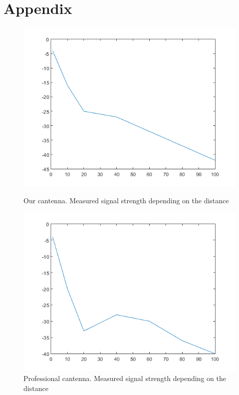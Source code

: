 \documentclass[12pt,a4paper]{article}
\newcommand{\figurewidth}[0]{.65\textwidth}
\begin{document}
\section{Appendix}
\pagestyle{empty}
\begin{figure}\begin{center}
	\includegraphics[width=\figurewidth]{plots/can_p.png}
	\caption{Our cantenna. Measured signal strength depending on the distance}
	\label{img:dist:pow:can}

	\includegraphics[width=\figurewidth]{plots/prof_p.png}
	\caption{Professional cantenna. Measured signal strength depending on the distance}
	\label{img:dist:pow:prof}


\end{center}
\end{figure}
\end{document}
